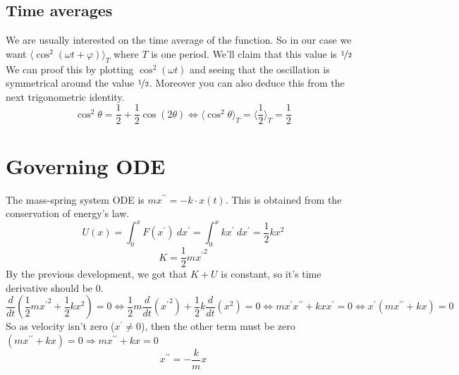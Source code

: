 \documentclass{report}
\begin{document}
        \subsection{Time averages}
          \noindent We are usually interested on the time average of the function. 
          \noindent So in our case we want $\langle\cos^2(\omega t+\varphi)\rangle_T$ where $T$ is one period. We'll claim that this value is $\nicefrac{1}{2}$ We can proof this by plotting $\cos^2(\omega t)$ and seeing that the oscillation is symmetrical around the value $\nicefrac{1}{2}$. Moreover you can also deduce this from the next trigonometric identity.
          \[\cos^2\theta=\dfrac{1}{2}+\dfrac{1}{2}\cos(2\theta)\Longleftrightarrow\langle\cos^2\theta\rangle_T=\langle\dfrac{1}{2}\rangle_T=\dfrac{1}{2}\]
      \section{Governing ODE}
        The mass-spring system ODE is $m x^{\prime\prime}=-k\cdot x(t)$. This is obtained from the conservation of energy's law.
        \[U(x)=\int_0^x F(x^\prime)\ dx^\prime=\int_0^x kx^\prime\ dx^\prime=\dfrac{1}{2}kx^2\]
        \[K=\dfrac{1}{2}m{x^{\prime}}^2\]
        \noindent By the previous development, we got that $K+U$ is constant, so it's time derivative should be $0$.
        \[\dfrac{d}{dt}\left(\dfrac{1}{2}m{x^\prime}^2+\dfrac{1}{2}kx^2\right)=0\Longleftrightarrow\dfrac12 m\dfrac{d}{dt}\left({x^\prime}^2\right)+\dfrac12 k\dfrac{d}{dt}(x^2)=0\Longleftrightarrow m x^\prime x^{\prime\prime}+kxx^\prime=0\Longleftrightarrow x^\prime\left(mx^{\prime\prime}+kx\right)=0\]
        So as velocity isn't zero ($x^\prime\neq0$), then the other term must be zero $\left(mx^{\prime\prime}+kx\right)=0 \Longrightarrow mx^{\prime\prime}+kx=0$
        \begin{equation}
          x^{\prime\prime}=-\dfrac{k}{m}x
        \end{equation}
\end{document}
